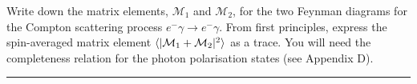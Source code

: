\begin{problem}{6.12}
Write down the matrix elements, $\mathcal{M}_1$ and $\mathcal{M}_2$, for the two Feynman diagrams for the Compton scattering process $e^-\gamma\to e^-\gamma$. From first principles, express the spin-averaged matrix element $\langle |\mathcal{M}_1+\mathcal{M}_2|^2 \rangle$ as a trace. You will need the completeness relation for the photon polarisation states (see Appendix D).
\end{problem}
\begin{solution}

\end{solution}

\noindent\rule{7in}{1.5pt}

